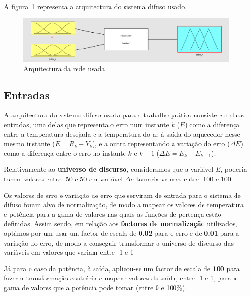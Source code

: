 \documentclass{article}
\begin{document}
A figura~\ref{nn_architecture} representa a arquitectura do sistema difuso usado.

\begin{figure}[!h]
  \centering
  \includegraphics[width=5in]{figures/nn_architecture}
  \caption{Arquitectura da rede usada}
  \label{nn_architecture}
\end{figure}

\subsection{Entradas}
\indent \indent A arquitectura do sistema difuso usada para o trabalho prático consiste em duas entradas, uma delas que representa o erro num instante $k$ ($E$) como a diferença entre a temperatura desejada e a temperatura do ar à saída do aquecedor nesse mesmo instante ($E = R_{k} - Y_{k}$), e a outra representando a variação do erro ($\Delta E$) como a diferença entre o erro no instante $k$ e $k-1$ ($\Delta E=E_{k}-E_{k-1}$).

Relativamente ao \textbf{universo de discurso}, considerámos que a variável $E$, poderia tomar valores entre -50 e 50 e a variável $\Delta e$ tomaria valores entre -100 e 100.

Os valores de erro e variação de erro que serviram de entrada para o sistema de difuso foram alvo de normalização, de modo a mapear os valores de temperatura e potência para a gama de valores nas quais as funções de pertença estão definidas. Assim sendo, em relação aos \textbf{factores de normalização} utilizados, optámos por um usar um factor de escala de \textbf{0.02} para o erro e de \textbf{0.01} para a variação do erro, de modo a conseguir transformar o universo de discurso das variáveis em valores que variam entre -1 e 1  

Já para o caso da potência, à saída, aplicou-se um factor de escala de \textbf{100} para fazer a transformação contrária e mapear valores da saída, entre -1 e 1, para a gama de valores que a potência pode tomar (entre 0 e 100\%). 

\end{document}
